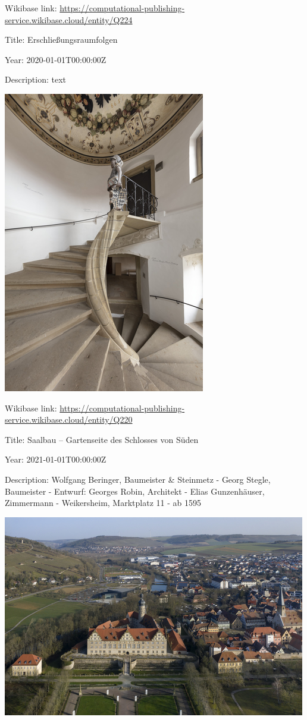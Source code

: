 \documentclass[
  letterpaper,
]{book}
\begin{document}
Wikibase link:
\url{https://computational-publishing-service.wikibase.cloud/entity/Q224}

Title: Erschließungsraumfolgen

Year: 2020-01-01T00:00:00Z

Description: text

\includegraphics{paintings_files/figure-pdf/cell-3-output-72.png}

Wikibase link:
\url{https://computational-publishing-service.wikibase.cloud/entity/Q220}

Title: Saalbau -- Gartenseite des Schlosses von Süden

Year: 2021-01-01T00:00:00Z

Description: Wolfgang Beringer, Baumeister \& Steinmetz - Georg Stegle,
Baumeister - Entwurf: Georges Robin, Architekt - Elias Gunzenhäuser,
Zimmermann - Weikersheim, Marktplatz 11 - ab 1595

\includegraphics{paintings_files/figure-pdf/cell-3-output-74.png}
\end{document}

